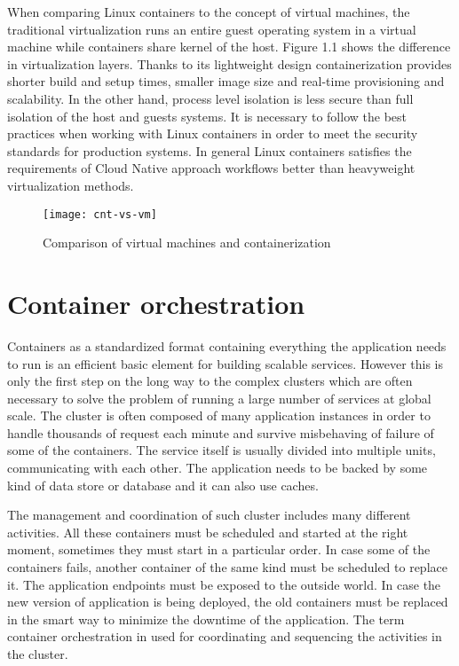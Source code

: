 \documentclass[
  digital, %
  twoside, %
  table,   %
  lof,     %
  lot,     %
]{fithesis3}
\begin{document}
When comparing Linux containers to the concept of virtual machines, the traditional virtualization runs an entire guest operating system in a virtual machine while containers share kernel of the host. Figure 1.1 shows the difference in virtualization layers. Thanks to its lightweight design containerization provides shorter build and setup times, smaller image size and real-time provisioning and scalability. In the other hand, process level isolation is less secure than full isolation of the host and guests systems. It is necessary to follow the best practices when working with Linux containers in order to meet the security standards for production systems. In general Linux containers satisfies the requirements of Cloud Native approach workflows better than heavyweight virtualization methods.

\begin{figure}[H]
\caption{Comparison of virtual machines and containerization}
\centering
\texttt{[image: cnt-vs-vm]}
\end{figure}

\section{Container orchestration} \label{orchestration}
Containers as a standardized format containing everything the application needs to run is an efficient basic element for building scalable services. However this is only the first step on the long way to the complex clusters which are often necessary to solve the problem of running a large number of services at global scale. The cluster is often composed of many application instances in order to handle thousands of request each minute and survive misbehaving of failure of some of the containers. The service itself is usually divided into multiple units, communicating with each other. The application needs to be backed by some kind of data store or database and it can also use caches.

The management and coordination of such cluster includes many different activities. All these containers must be scheduled and started at the right moment, sometimes they must start in a particular order. In case some of the containers fails, another container of the same kind must be scheduled to replace it. The application endpoints must be exposed to the outside world. In case the new version of application is being deployed, the old containers must be replaced in the smart way to minimize the downtime of the application. The term container orchestration in used for coordinating and sequencing the activities in the cluster.
\end{document}
